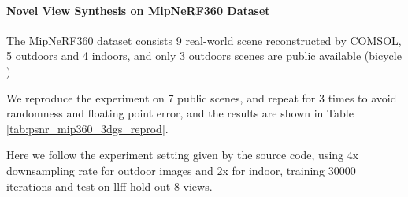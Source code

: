 \paragraph{Novel View Synthesis on MipNeRF360 Dataset}

\begin{table}
    
\end{table}

The MipNeRF360 dataset consists 9 real-world scene reconstructed by COMSOL, 5 outdoors and 4 indoors, and only 3 outdoors scenes are public available (bicycle )

We reproduce the experiment on 7 public scenes, and repeat for 3 times to avoid randomness and floating point error, and the results are shown in Table \ref{tab:psnr_mip360_3dgs_reprod}.

Here we follow the experiment setting given by the source code, using 4x downsampling rate for outdoor images and 2x for indoor, training 30000 iterations and test on llff hold out 8 views.

